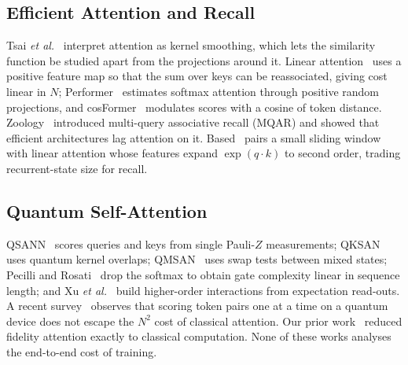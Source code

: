 \documentclass[conference]{IEEEtran}
\theoremstyle{definition}
\begin{document}
\subsection{Efficient Attention and Recall}
Tsai \emph{et al.}~\cite{tsai2019dissection} interpret attention as kernel smoothing, which lets the similarity function be studied apart from the projections around it. Linear attention~\cite{katharopoulos2020linear} uses a positive feature map so that the sum over keys can be reassociated, giving cost linear in $N$; Performer~\cite{choromanski2021performer} estimates softmax attention through positive random projections, and cosFormer~\cite{qin2022cosformer} modulates scores with a cosine of token distance. Zoology~\cite{arora2024zoology} introduced multi-query associative recall (MQAR) and showed that efficient architectures lag attention on it. Based~\cite{arora2024based} pairs a small sliding window with linear attention whose features expand $\exp(q\cdot k)$ to second order, trading recurrent-state size for recall.

\subsection{Quantum Self-Attention}
QSANN~\cite{li2024qsann} scores queries and keys from single Pauli-$Z$ measurements; QKSAN~\cite{zhao2024qksan} uses quantum kernel overlaps; QMSAN~\cite{chen2024qmsan} uses swap tests between mixed states; Pecilli and Rosati~\cite{pecilli2026overlap} drop the softmax to obtain gate complexity linear in sequence length; and Xu \emph{et al.}~\cite{xu2026higher} build higher-order interactions from expectation read-outs. A recent survey~\cite{zhang2025survey} observes that scoring token pairs one at a time on a quantum device does not escape the $N^2$ cost of classical attention. Our prior work~\cite{singuru2026fidelity} reduced fidelity attention exactly to classical computation. None of these works analyses the end-to-end cost of training.
\end{document}
